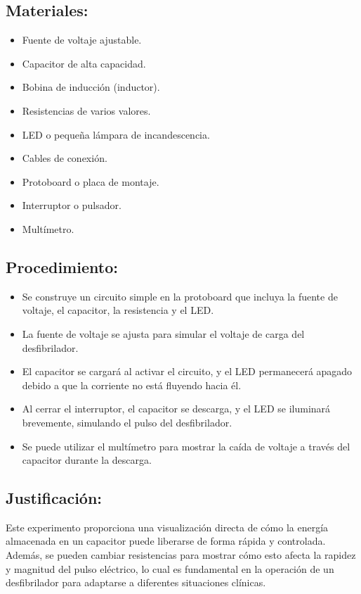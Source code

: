 \subsection{Materiales:}
\begin{itemize}
    \item Fuente de voltaje ajustable.
    \item Capacitor de alta capacidad.
    \item Bobina de inducción (inductor).
    \item Resistencias de varios valores.
    \item LED o pequeña lámpara de incandescencia.
    \item Cables de conexión.
    \item Protoboard o placa de montaje.
    \item Interruptor o pulsador.
    \item Multímetro.
\end{itemize}

\subsection{Procedimiento:}
\begin{itemize}
    \item Se construye un circuito simple en la protoboard que incluya la fuente de voltaje, el capacitor, la resistencia y el LED.
    \item La fuente de voltaje se ajusta para simular el voltaje de carga del desfibrilador.
    \item El capacitor se cargará al activar el circuito, y el LED permanecerá apagado debido a que la corriente no está fluyendo hacia él.
    \item Al cerrar el interruptor, el capacitor se descarga, y el LED se iluminará brevemente, simulando el pulso del desfibrilador.
    \item Se puede utilizar el multímetro para mostrar la caída de voltaje a través del capacitor durante la descarga.
\end{itemize}

\subsection{Justificación:}
Este experimento proporciona una visualización directa de cómo la energía almacenada en un capacitor puede liberarse de forma rápida y controlada. Además, se pueden cambiar resistencias para mostrar cómo esto afecta la rapidez y magnitud del pulso eléctrico, lo cual es fundamental en la operación de un desfibrilador para adaptarse a diferentes situaciones clínicas.

